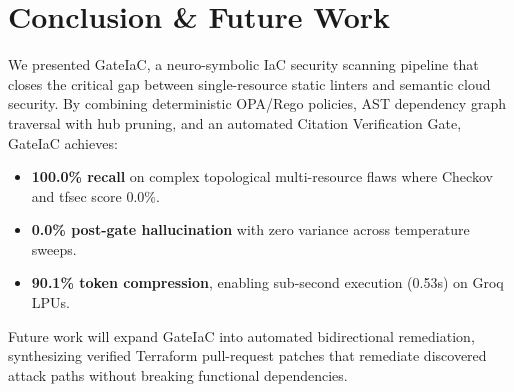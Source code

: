 \documentclass[conference]{IEEEtran}
\begin{document}
\section{Conclusion \& Future Work}

We presented GateIaC, a neuro-symbolic IaC security scanning pipeline that closes the critical gap between single-resource static linters and semantic cloud security. By combining deterministic OPA/Rego policies, AST dependency graph traversal with hub pruning, and an automated Citation Verification Gate, GateIaC achieves:
\begin{itemize}
    \item \textbf{100.0\% recall} on complex topological multi-resource flaws where Checkov and tfsec score 0.0\%.
    \item \textbf{0.0\% post-gate hallucination} with zero variance across temperature sweeps.
    \item \textbf{90.1\% token compression}, enabling sub-second execution (0.53s) on Groq LPUs.
\end{itemize}

Future work will expand GateIaC into automated bidirectional remediation, synthesizing verified Terraform pull-request patches that remediate discovered attack paths without breaking functional dependencies.



\end{document}
